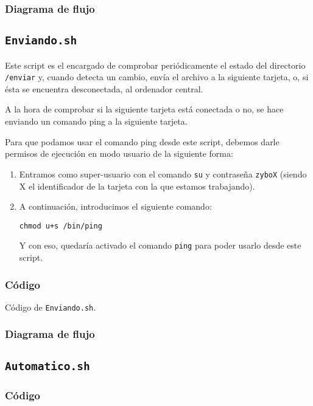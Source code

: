 \documentclass[12pt,letterpaper]{article}
\begin{document}
\subsubsection{Diagrama de flujo}


\subsection{\texttt{Enviando.sh}}
Este script es el encargado de comprobar periódicamente el estado del directorio \texttt{/enviar} y, cuando detecta un cambio, envía el archivo a la siguiente tarjeta, o, si ésta se encuentra desconectada, al ordenador central.

A la hora de comprobar si la siguiente tarjeta está conectada o no, se hace enviando un comando ping a la siguiente tarjeta.

Para que podamos usar el comando ping desde este script, debemos darle permisos de ejecución en modo usuario de la siguiente forma:
\begin{enumerate}
	\item Entramos como super-usuario con el comando \texttt{su} y contraseña \texttt{zyboX} (siendo X el identificador de la tarjeta con la que estamos trabajando).
	\item A continuación, introducimos el siguiente comando:
	\begin{center}
		\texttt{chmod u+s /bin/ping}
	\end{center}
	Y con eso, quedaría activado el comando \texttt{ping} para poder usarlo desde este script.
\end{enumerate}

\subsubsection{Código}

\begin{center}
	Código de \texttt{Enviando.sh}.
\end{center}

\subsubsection{Diagrama de flujo}


\subsection{\texttt{Automatico.sh}}
\subsubsection{Código}
\end{document}
